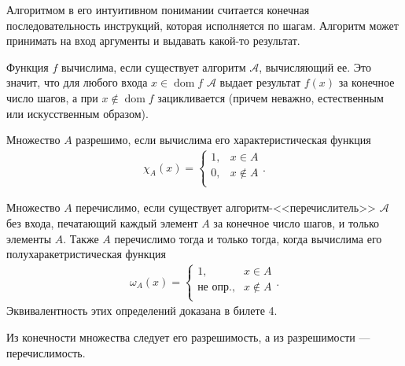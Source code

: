 \documentclass[a4paper, fleqn]{article}
\DeclareMathOperator{\dom}{\mathop{\mathrm{dom}}}
\newcommand{\udv}{\text{не опр.}} %
\begin{document}
        Алгоритмом в его интуитивном понимании считается конечная последовательность инструкций, которая исполняется по шагам. Алгоритм может принимать на вход аргументы и выдавать какой-то результат.

        \begin{definition}
        Функция $f$ вычислима, если существует алгоритм $\mathcal{A}$, вычисляющий ее. Это значит, что для любого входа $x \in \dom f$ $\mathcal{A}$ выдает результат $f(x)$ за конечное число шагов, а при $x \notin \dom f$ зацикливается (причем неважно, естественным или искусственным образом).
        \end{definition}

        \begin{definition}
        Множество $A$ разрешимо, если вычислима его характеристическая функция
        \begin{equation*}
        \begin{gathered}
        \chi_A(x) =
        \begin{cases}
        1, & x \in A \\
        0, & x \notin A \\
        \end{cases}.
        \end{gathered}
        \end{equation*}
        \end{definition}

        \begin{definition}
        Множество $A$ перечислимо, если существует алгоритм-<<перечислитель>> $\mathcal{A}$ без входа, печатающий каждый элемент $A$ за конечное число шагов, и только элементы $A$. Также $A$ перечислимо тогда и только тогда, когда вычислима его полухаракетристическая функция
        \begin{equation*}
        \begin{gathered}
        \omega_A(x) =
        \begin{cases}
        1, & x \in A \\
        \udv, & x \notin A \\
        \end{cases}.
        \end{gathered}
        \end{equation*}
        Эквивалентность этих определений доказана в билете 4.
        \end{definition}

        \begin{proposition}
            Из конечности множества следует его разрешимость, а из разрешимости --- перечислимость.
        \end{proposition}
\end{document}

